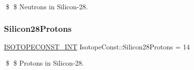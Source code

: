 \$ \$ Neutrons in Silicon-\/28. \mbox{\label{group___isotope_const-_silicon-_si28_ga1da1e0956fa0186d3f8fcea3f3d4b350}} 
\subsubsection{\texorpdfstring{Silicon28\+Protons}{Silicon28Protons}}
{\footnotesize\ttfamily \mbox{\hyperlink{group___isotope_const-_macros_ga5f18360b3e99483a35c32d789e62621c}{I\+S\+O\+T\+O\+P\+E\+C\+O\+N\+S\+T\+\_\+\+I\+NT}} Isotope\+Const\+::\+Silicon28\+Protons = 14}

\$ \$ Protons in Silicon-\/28. 